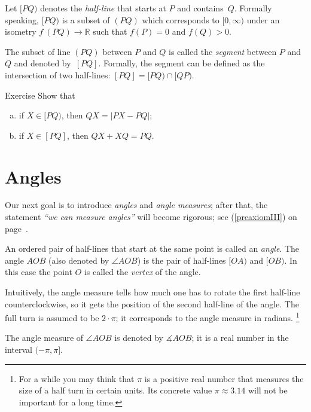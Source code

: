 Let $[P Q)$ denotes the \emph{half-line}
that starts at $P$ and contains~$Q$. 
Formally speaking, $[P Q)$ is a subset of $(P Q)$ which corresponds to $[0,\infty)$ under an isometry $f\:(P Q)\to \mathbb{R}$ such that $f(P)=0$ and $f(Q)>0$.

The subset of line $(P Q)$ between $P$ and $Q$ is called the \emph{segment} between $P$ and $Q$ and denoted by~$[P Q]$.
Formally, the segment can be defined as the intersection of two half-lines: $[P Q]=[P Q)\cap[Q P)$.

\begin{thm}{Exercise}\label{ex:trig==}
Show that 
\begin{enumerate}[(a)]
\item if $X\in [PQ)$, then 
$QX=|PX-PQ|$;
\item if $X\in [PQ]$, then 
$QX+XQ=PQ$.
\end{enumerate}

\end{thm}


\section*{Angles}

Our next goal is to introduce {}\emph{angles} and {}\emph{angle measures}; 
after that, the statement {}\emph{``we can measure angles''} will become rigorous;
see (\ref{preaxiomIII}) on page~\pageref{preaxiomIII}.

An ordered pair of half-lines that start at the same point is called an \emph{angle}.
The angle $AOB$ (also denoted by $\angle AOB$) is the pair of half-lines $[OA)$ and $[OB)$.
In this case the point $O$ is called the \emph{vertex} of the angle.

Intuitively, the angle measure tells how much one has to rotate the first half-line counterclockwise, so it gets the position of the second half-line of the angle. 
The full turn is assumed to be $2\cdot\pi$;
it corresponds to the angle measure in radians.%
\footnote{For a while you may think that $\pi$ is a positive real number that measures the size of a half turn in certain units. Its concrete value $\pi\approx 3.14$ will not be important for a long time.}

The angle measure of $\angle AOB$ is denoted by $\measuredangle AOB$;
it is a real number in the interval $(-\pi,\pi]$. 


